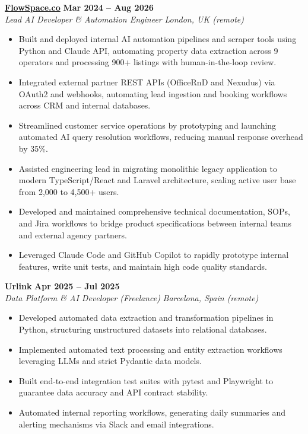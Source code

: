 \documentclass[10pt,a4paper]{article}
\newcommand{\role}[4]{%
  \textbf{#1} \hfill \textbf{#2}\\[1pt]%
  \textit{#3} \hfill \textit{#4}\\[2pt]%
}
\begin{document}
\role{\href{https://flowspace.co}{FlowSpace.co}}{Mar 2024 -- Aug 2026}{Lead AI Developer \& Automation Engineer}{London, UK (remote)}
\begin{itemize}
  \item Built and deployed internal AI automation pipelines and scraper tools using Python and Claude API, automating property data extraction across 9 operators and processing 900+ listings with human-in-the-loop review.
  \item Integrated external partner REST APIs (OfficeRnD and Nexudus) via OAuth2 and webhooks, automating lead ingestion and booking workflows across CRM and internal databases.
  \item Streamlined customer service operations by prototyping and launching automated AI query resolution workflows, reducing manual response overhead by 35\%.
  \item Assisted engineering lead in migrating monolithic legacy application to modern TypeScript/React and Laravel architecture, scaling active user base from 2,000 to 4,500+ users.
  \item Developed and maintained comprehensive technical documentation, SOPs, and Jira workflows to bridge product specifications between internal teams and external agency partners.
  \item Leveraged Claude Code and GitHub Copilot to rapidly prototype internal features, write unit tests, and maintain high code quality standards.
\end{itemize}

\role{Urlink}{Apr 2025 -- Jul 2025}{Data Platform \& AI Developer (Freelance)}{Barcelona, Spain (remote)}
\begin{itemize}
  \item Developed automated data extraction and transformation pipelines in Python, structuring unstructured datasets into relational databases.
  \item Implemented automated text processing and entity extraction workflows leveraging LLMs and strict Pydantic data models.
  \item Built end-to-end integration test suites with pytest and Playwright to guarantee data accuracy and API contract stability.
  \item Automated internal reporting workflows, generating daily summaries and alerting mechanisms via Slack and email integrations.
\end{itemize}
\end{document}
